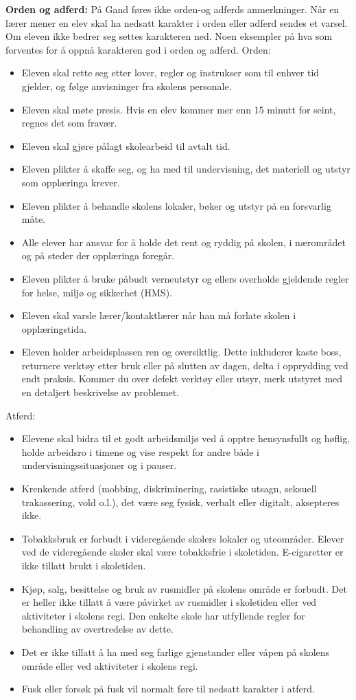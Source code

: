 \noindent
{\bf Orden og adferd:} På Gand føres ikke orden-og adferds anmerkninger. Når en lærer mener en elev skal ha nedsatt karakter i orden eller adferd sendes et varsel. Om eleven ikke bedrer seg settes karakteren ned. 
\vskip 10pt
Noen eksempler på hva som forventes for å oppnå karakteren god i orden og adferd. 
\vskip 10pt
Orden:
\begin{itemize}
\vskip 10pt
\item{}Eleven skal rette seg etter lover, regler og instrukser som til enhver tid gjelder, og følge anvisninger fra skolens personale.
\item{}Eleven skal møte presis. Hvis en elev kommer mer enn 15 minutt for seint, regnes det som fravær.
\item{}Eleven skal gjøre pålagt skolearbeid til avtalt tid.
\item{}Eleven plikter å skaffe seg, og ha med til undervisning, det materiell og utstyr som opplæringa krever.
\item{}Eleven plikter å behandle skolens lokaler, bøker og utstyr på en forsvarlig måte.
\item{}Alle elever har ansvar for å holde det rent og ryddig på skolen, i nærområdet og på steder der opplæringa foregår.
\item{}Eleven plikter å bruke påbudt verneutstyr og ellers overholde gjeldende regler for helse, miljø og sikkerhet (HMS).
\item{}Eleven skal varsle lærer/kontaktlærer når han må forlate skolen i opplæringstida.

\item{} Eleven holder arbeidsplassen ren og oversiktlig. Dette inkluderer kaste boss, returnere verktøy etter bruk eller på slutten av dagen, delta i opprydding ved endt praksis. Kommer du over defekt verktøy eller utsyr, merk utstyret med en detaljert beskrivelse av problemet. 
\vskip 10pt
\end{itemize}
Atferd:
\vskip 10pt
\begin{itemize}
\item{}Elevene skal bidra til et godt arbeidsmiljø ved å opptre hensynsfullt og høflig, holde arbeidsro i timene og vise respekt for andre både i undervisningssituasjoner og i pauser.
\item{}Krenkende atferd (mobbing, diskriminering, rasistiske utsagn, seksuell trakassering, vold o.l.), det være seg fysisk, verbalt eller digitalt, aksepteres ikke.
\item{}Tobakksbruk er forbudt i videregående skolers lokaler og uteområder. Elever ved de videregående skoler skal være tobakksfrie i skoletiden. E-cigaretter er ikke tillatt brukt i skoletiden.
\item{}Kjøp, salg, besittelse og bruk av rusmidler på skolens område er forbudt. Det er heller ikke tillatt å være påvirket av rusmidler i skoletiden eller ved aktiviteter i skolens regi. Den enkelte skole har utfyllende regler for behandling av overtredelse av dette.
\item{}Det er ikke tillatt å ha med seg farlige gjenstander eller våpen på skolens område eller ved aktiviteter i skolens regi.
\item{}Fusk eller forsøk på fusk vil normalt føre til nedsatt karakter i atferd.
\end{itemize}
